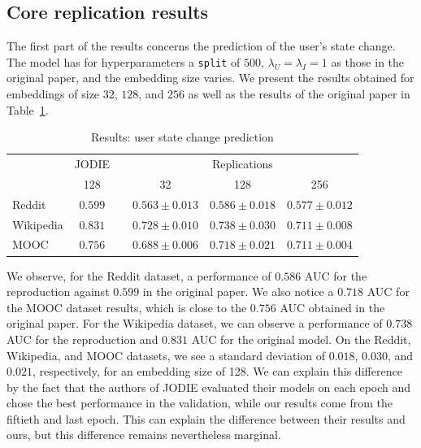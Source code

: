 \subsection{Core replication results}
The first part of the results concerns the prediction of the user's state change. The model has for hyperparameters a \texttt{split} of $500$, $\lambda_U = \lambda_I = 1$ as those in the original paper, and the embedding size varies. We present the results obtained for embeddings of size $32$, $128$, and $256$ as well as the results of the original paper in %
Table~\ref{result-state}.

\begin{table}[htbp]
    \centering
    \begin{tabular}{@{}lcrrrr@{}}
    \toprule
    & JODIE & \phantom{abc} & \multicolumn{3}{c}{Replications} \\
    \cmidrule{2-2} \cmidrule{4-6}
    & 128 && \multicolumn{1}{c}{32} & \multicolumn{1}{c}{128} & \multicolumn{1}{c}{256} \\
    \midrule
    Reddit & $\boldsymbol{0.599}$ && $0.563 \pm 0.013$ & $0.586 \pm 0.018$ & $0.577 \pm 0.012$\\
    Wikipedia &$\boldsymbol{0.831}$ && $0.728 \pm 0.010$ & $0.738 \pm 0.030$ & $0.711 \pm 0.008$\\
    MOOC &$\boldsymbol{0.756}$ && $0.688 \pm 0.006$ & $0.718 \pm 0.021$ & $0.711 \pm 0.004$\\
    \bottomrule
    \end{tabular}
    \caption{Results: user state change prediction}
    \label{result-state}
\end{table}

We observe, for the Reddit dataset, a performance of $0.586$ AUC for the reproduction against $0.599$ in the original paper. We also notice a  $0.718$ AUC  for the MOOC dataset results, which is close to the $0.756$ AUC obtained in the original paper. For the Wikipedia dataset, we can observe a performance of $0.738$ AUC for the reproduction and $0.831$ AUC for the original model. On the Reddit, Wikipedia, and MOOC datasets, we see a standard deviation of $0.018$, $0.030$, and $0.021$, respectively, for an embedding size of 128. We can explain this difference by the fact that the authors of JODIE evaluated their models on each epoch and chose the best performance in the validation, while our results come from the fiftieth and last epoch. This can explain the difference between their results and ours, but this difference remains nevertheless marginal.

